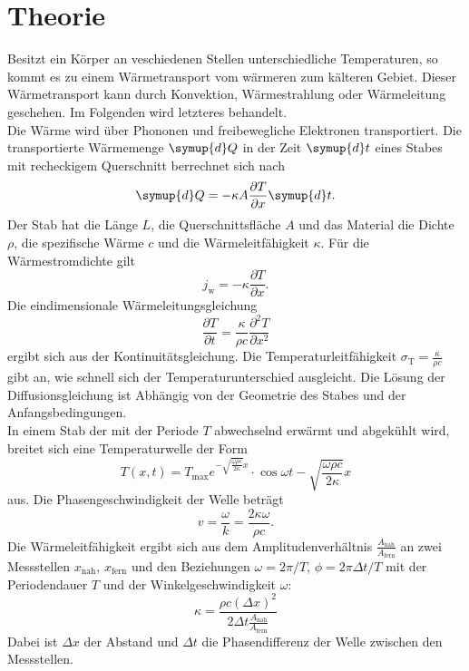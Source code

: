 \section{Theorie}
\label{sec:Theorie}
Besitzt ein Körper an veschiedenen Stellen unterschiedliche Temperaturen, so kommt es zu einem Wärmetransport vom wärmeren zum kälteren Gebiet.
Dieser Wärmetransport kann durch Konvektion, Wärmestrahlung oder Wärmeleitung geschehen.
Im Folgenden wird letzteres behandelt.\\
Die Wärme wird über Phononen und freibewegliche Elektronen transportiert.
Die transportierte Wärmemenge $\symup{d}Q$ in der Zeit $\symup{d}t$ eines Stabes mit recheckigem Querschnitt berrechnet sich nach
\begin{equation}
    \symup{d}Q = -\kappa A \frac{\partial T}{\partial x} \symup{d}t .
    \label{eqn:leit}
\end{equation}
Der Stab hat die Länge $L$, die Querschnittsfläche $A$ und das Material die Dichte $\rho$, die spezifische Wärme $c$ und die Wärmeleitfähigkeit $\kappa$.
Für die Wärmestromdichte gilt 
\begin{equation}
    j_\text{w} = -\kappa \frac{\partial T}{\partial x} .
\end{equation}
Die eindimensionale Wärmeleitungsgleichung
\begin{equation}
    \frac{\partial T}{\partial t} = \frac{\kappa}{\rho c} \frac{\partial^2 T}{\partial x^2}
    \label{eqn:wellengleichung}
\end{equation}
ergibt sich aus der Kontinuitätsgleichung.
Die Temperaturleitfähigkeit $\sigma_\text{T} = \frac{\kappa}{\rho c}$ gibt an, wie schnell sich der Temperaturunterschied ausgleicht.
Die Lösung der Diffusionsgleichung ist Abhängig von der Geometrie des Stabes und der Anfangsbedingungen.
\\
In einem Stab der mit der Periode $T$ abwechselnd erwärmt und abgekühlt wird, breitet sich eine Temperaturwelle der Form
\begin{equation}
    T(x,t) = T_\text{max} e^{-\sqrt{\frac{\omega \rho c}{2 \kappa}}x} \cdot \cos{\omega t - \sqrt{\frac{\omega \rho c}{2 \kappa}}x}
\end{equation}
aus.
Die Phasengeschwindigkeit der Welle beträgt
\begin{equation}
    v = \frac{\omega}{k} = \frac{2 \kappa \omega}{\rho c} .
\end{equation}
Die Wärmeleitfähigkeit ergibt sich aus dem Amplitudenverhältnis $\frac{A_\text{nah}}{A_\text{fern}}$ an zwei Messstellen $x_\text{nah}$, $x_\text{fern}$ und den Beziehungen $\omega = 2\pi / T$, $\phi = 2 \pi \Delta t / T$ mit der Periodendauer $T$ und der Winkelgeschwindigkeit $\omega$:
\begin{equation}
    \kappa = \frac{\rho c (\Delta x)^2}{2 \Delta t \frac{A_\text{nah}}{A_\text{fern}}}
    \label{eqn:kappa}
\end{equation}
Dabei ist $\Delta x$ der Abstand und $\Delta t$ die Phasendifferenz der Welle zwischen den Messstellen.